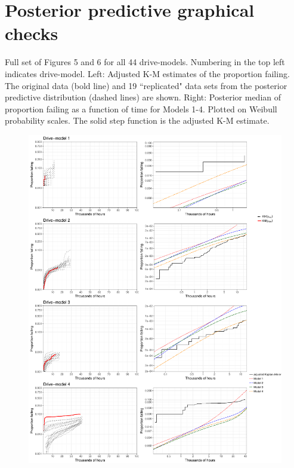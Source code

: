 \documentclass[12pt]{article}
\begin{document}
\section{Posterior predictive graphical checks}
Full set of Figures 5 and 6 for all 44 drive-models.  Numbering in the top left indicates drive-model.  Left: Adjusted K-M estimates of the proportion failing.  The original data (bold line) and 19 ``replicated" data sets from the posterior predictive distribution (dashed lines) are shown.  Right: Posterior median of proportion failing as a function of time for Models 1-4.  Plotted on Weibull probability scales.  The solid step function is the adjusted K-M estimate.  
\begin{figure}[H]
\includegraphics[width=\textwidth]{ppcheck-v3-1.pdf}
\end{figure}
\end{document}
